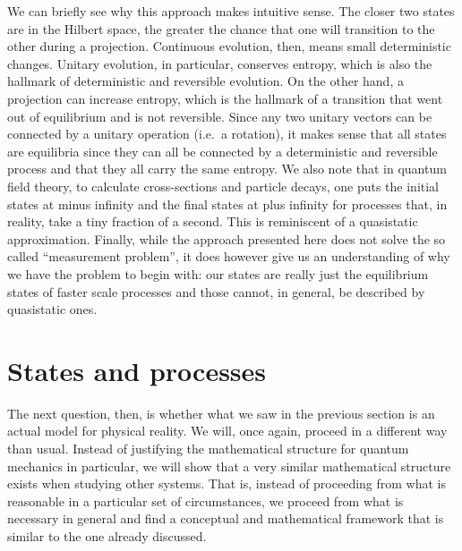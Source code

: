 \documentclass[11pt]{article}
\begin{document}
We can briefly see why this approach makes intuitive sense. The closer two states are in the Hilbert space, the greater the chance that one will transition to the other during a projection. Continuous evolution, then, means small deterministic changes. Unitary evolution, in particular, conserves entropy, which is also the hallmark of deterministic and reversible evolution. On the other hand, a projection can increase entropy, which is the hallmark of a transition that went out of equilibrium and is not reversible. Since any two unitary vectors can be connected by a unitary operation (i.e.~a rotation), it makes sense that all states are equilibria since they can all be connected by a deterministic and reversible process and that they all carry the same entropy. We also note that in quantum field theory, to calculate cross-sections and particle decays, one puts the initial states at minus infinity and the final states at plus infinity for processes that, in reality, take a tiny fraction of a second. This is reminiscent of a quasistatic approximation. Finally, while the approach presented here does not solve the so called ``measurement problem'', it does however give us an understanding of why we have the problem to begin with: our states are really just the equilibrium states of faster scale processes and those cannot, in general, be described by quasistatic ones.


\section{States and processes}

The next question, then, is whether what we saw in the previous section is an actual model for physical reality. We will, once again, proceed in a different way than usual. Instead of justifying the mathematical structure for quantum mechanics in particular, we will show that a very similar mathematical structure exists when studying other systems. That is, instead of proceeding from what is reasonable in a particular set of circumstances, we proceed from what is necessary in general and find a conceptual and mathematical framework that is similar to the one already discussed.
\end{document}
